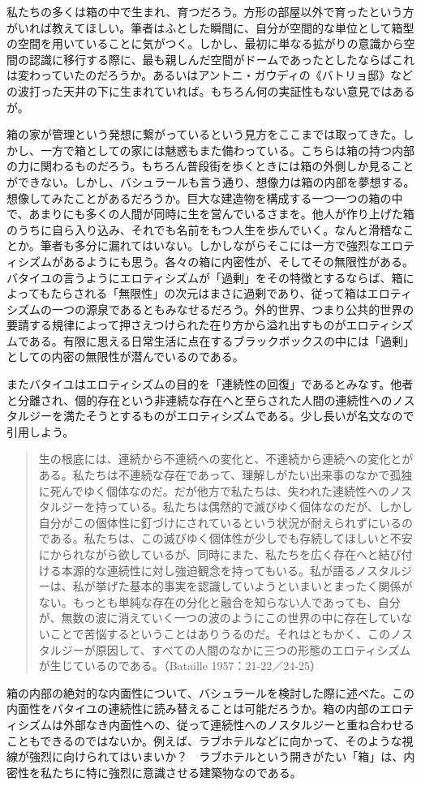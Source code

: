 \documentclass[b5j,twoside,twocolumn]{utarticle}
\begin{document}
私たちの多くは箱の中で生まれ、育つだろう。方形の部屋以外で育ったという方がいれば教えてほしい。筆者はふとした瞬間に、自分が空間的な単位として箱型の空間を用いていることに気がつく。しかし、最初に単なる拡がりの意識から空間の認識に移行する際に、最も親しんだ空間がドームであったとしたならばこれは変わっていたのだろうか。あるいはアントニ・ガウディの《バトリョ邸》などの波打った天井の下に生まれていれば。もちろん何の実証性もない意見ではあるが。


箱の家が管理という発想に繋がっているという見方をここまでは取ってきた。しかし、一方で箱としての家には魅惑もまた備わっている。こちらは箱の持つ内部の力に関わるものだろう。もちろん普段街を歩くときには箱の外側しか見ることができない。しかし、バシュラールも言う通り、想像力は箱の内部を夢想する。想像してみたことがあるだろうか。巨大な建造物を構成する一つ一つの箱の中で、あまりにも多くの人間が同時に生を営んでいるさまを。他人が作り上げた箱のうちに自ら入り込み、それでも名前をもつ人生を歩んでいく。なんと滑稽なことか。筆者も多分に漏れてはいない。しかしながらそこには一方で強烈なエロティシズムがあるようにも思う。各々の箱に内密性が、そしてその無限性がある。バタイユの言うようにエロティシズムが「過剰」をその特徴とするならば、箱によってもたらされる「無限性」の次元はまさに過剰であり、従って箱はエロティシズムの一つの源泉であるともみなせるだろう。外的世界、つまり公共的世界の要請する規律によって押さえつけられた在り方から溢れ出すものがエロティシズムである。有限に思える日常生活に点在するブラックボックスの中には「過剰」としての内密の無限性が潜んでいるのである。


またバタイユはエロティシズムの目的を「連続性の回復」であるとみなす。他者と分離され、個的存在という非連続な存在へと至らされた人間の連続性へのノスタルジーを満たそうとするものがエロティシズムである。少し長いが名文なので引用しよう。
\begin{quote}
生の根底には、連続から不連続への変化と、不連続から連続への変化とがある。私たちは不連続な存在であって、理解しがたい出来事のなかで孤独に死んでゆく個体なのだ。だが他方で私たちは、失われた連続性へのノスタルジーを持っている。私たちは偶然的で滅びゆく個体なのだが、しかし自分がこの個体性に釘づけにされているという状況が耐えられずにいるのである。私たちは、この滅びゆく個体性が少しでも存続してほしいと不安にかられながら欲しているが、同時にまた、私たちを広く存在へと結び付ける本源的な連続性に対し強迫観念を持ってもいる。私が語るノスタルジーは、私が挙げた基本的事実を認識していようといまいとまったく関係がない。もっとも単純な存在の分化と融合を知らない人であっても、自分が、無数の波に消えていく一つの波のようにこの世界の中に存在していないことで苦悩するということはありうるのだ。それはともかく、このノスタルジーが原因して、すべての人間のなかに三つの形態のエロティシズムが生じているのである。（Bataille 1957：21-22／24-25）
\end{quote}
箱の内部の絶対的な内面性について、バシュラールを検討した際に述べた。この内面性をバタイユの連続性に読み替えることは可能だろうか。箱の内部のエロティシズムは外部なき内面性への、従って連続性へのノスタルジーと重ね合わせることもできるのではないか。例えば、ラブホテルなどに向かって、そのような視線が強烈に向けられてはいまいか？　ラブホテルという開きがたい「箱」は、内密性を私たちに特に強烈に意識させる建築物なのである。
\end{document}
